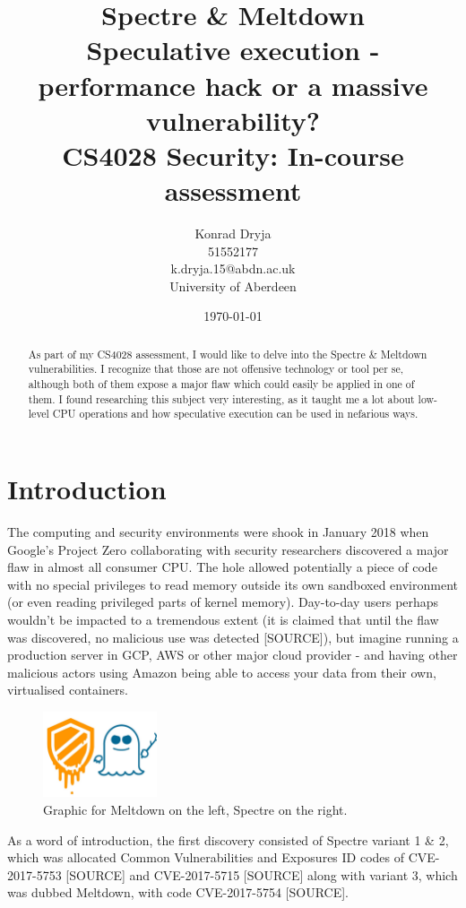 \documentclass{article}
\title{Spectre \& Meltdown \\
\large{Speculative execution - performance hack or a massive vulnerability? \\ CS4028 Security: In-course assessment}}
\author{Konrad Dryja \\ 51552177 \\ k.dryja.15@abdn.ac.uk \\ University of Aberdeen}
\date{\today}
\begin{document}
 
\maketitle
 
\tableofcontents

\begin{abstract}
  As part of my CS4028 assessment, I would like to delve into the Spectre \& Meltdown vulnerabilities. I recognize that those are not offensive technology or tool per se, although both of them expose a major flaw which could easily be applied in one of them. I found researching this subject very interesting, as it taught me a lot about low-level CPU operations and how speculative execution can be used in nefarious ways. 
\end{abstract}
 
\section{Introduction}
 
The computing and security environments were shook in January 2018 when Google's Project Zero collaborating with security researchers discovered a major flaw in almost all consumer CPU. The hole allowed potentially a piece of code with no special privileges to read memory outside its own sandboxed environment (or even reading privileged parts of kernel memory). Day-to-day users perhaps wouldn't be impacted to a tremendous extent (it is claimed that until the flaw was discovered, no malicious use was detected [SOURCE]), but imagine running a production server in GCP, AWS or other major cloud provider - and having other malicious actors using Amazon being able to access your data from their own, virtualised containers. 

\begin{figure}[h]
\centering
\includegraphics[width=0.3\textwidth]{logo}
  \caption{Graphic for Meltdown on the left, Spectre on the right.}
\end{figure}

As a word of introduction, the first discovery consisted of Spectre variant 1 \& 2, which was allocated Common Vulnerabilities and Exposures ID codes of CVE-2017-5753 [SOURCE] and CVE-2017-5715 [SOURCE] along with variant 3, which was dubbed Meltdown, with code CVE-2017-5754 [SOURCE].
 
\end{document}

